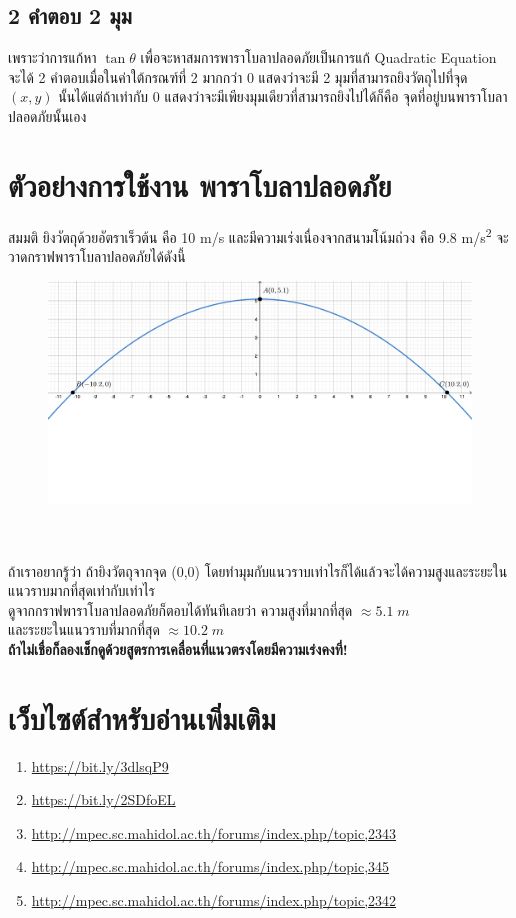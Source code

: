 \documentclass[a4paper,12pt]{article}
\begin{document}
	\subsection{2 คำตอบ 2 มุม}
	เพราะว่าการแก้หา $\tan\theta$ เพื่อจะหาสมการพาราโบลาปลอดภัยเป็นการแก้ Quadratic Equation จะได้ 2 คำตอบเมื่อในค่าใต้กรณฑ์ที่ 2 มากกว่า 0 แสดงว่าจะมี 2 มุมที่สามารถยิงวัตถุไปที่จุด $(x,y)$ นั้นได้แต่ถ้าเท่ากับ 0 แสดงว่าจะมีเพียงมุมเดียวที่สามารถยิงไปได้ก็คือ จุดที่อยู่บนพาราโบลาปลอดภัยนั้นเอง
\section{ตัวอย่างการใช้งาน พาราโบลาปลอดภัย}
	สมมติ ยิงวัตถุด้วยอัตราเร็วต้น คือ 10 \si{m/s} และมีความเร่งเนื่องจากสนามโน้มถ่วง คือ 9.8 \si{m/s^2} จะวาดกราฟพาราโบลาปลอดภัยได้ดังนี้
	\begin{figure}[h]
	\centering
	\includegraphics[width=1\linewidth]{pos}	
	\label{fig:pos}
	\end{figure}\\
	\\\indent ถ้าเราอยากรู้ว่า ถ้ายิงวัตถุจากจุด (0,0) โดยทำมุมกับแนวราบเท่าไรก็ได้แล้วจะได้ความสูงและระยะในแนวราบมากที่สุดเท่ากับเท่าไร\\
	ดูจากกราฟพาราโบลาปลอดภัยก็ตอบได้ทันทีเลยว่า ความสูงที่มากที่สุด $\approx 5.1\;\si{m}$ \\และระยะในแนวราบที่มากที่สุด $\approx 10.2\;\si{m}$\\
	\textbf{ถ้าไม่เชื่อก็ลองเช็กดูด้วยสูตรการเคลื่อนที่แนวตรงโดยมีความเร่งคงที่!}
\section{เว็บไซต์สำหรับอ่านเพิ่มเติม}
	\begin{enumerate}
		\item \url{https://bit.ly/3dlsqP9}
		\item \url{https://bit.ly/2SDfoEL}
		\item \url{http://mpec.sc.mahidol.ac.th/forums/index.php/topic,2343}
		\item \url{http://mpec.sc.mahidol.ac.th/forums/index.php/topic,345}
		\item \url{http://mpec.sc.mahidol.ac.th/forums/index.php/topic,2342}
	\end{enumerate}
\end{document}
